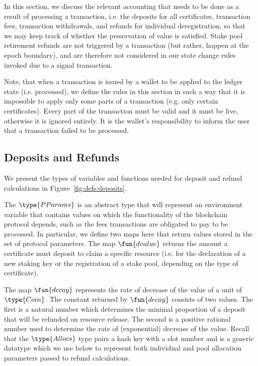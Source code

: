 \documentclass[11pt,a4paper,dvipsnames]{article}
\newcommand{\Coin}{\type{Coin}}
\newcommand{\PParams}{\type{PParams}}
\newcommand{\Allocs}{\type{Allocs}}
\theoremstyle{definition}
\theoremstyle{definition}
\begin{document}
In this section, we discuss the relevant accounting that needs to be done
as a result of processing a transaction, i.e. the deposits for all certificates,
transaction fees, transaction withdrawals, and refunds for individual
deregistration, so that we may keep track of whether the preservation of
value is satisfied. Stake pool retirement refunds are not triggered by a
transaction (but rather, happen at the epoch boundary), and are therefore
not considered in our state change rules invoked due to a signal transaction.

Note, that when a transaction is issued by a wallet to be applied to the ledger
state (i.e. processed),
we define the rules in this section in such a way that it is impossible to
apply only some parts of a transaction (e.g. only certain certificates).
Every part of the transaction must be valid and it must be live, otherwise
it is ignored entirely. It is the wallet's responsibility to inform the user
that a transaction failed to be processed.

\subsection{Deposits and Refunds}
\label{sec:deps-refunds}

We present the types of variables and functions needed for deposit and
refund calculations in Figure~\ref{fig:defs:deposits}.

The $\PParams$ is
an abstract type that will represent an environment variable that contains
values on which the functionality of the blockchain protocol depends, such
as the fees transactions are obligated to pay to be processed. In particular,
we define two maps here that return values stored in the set of protocol
parameters. The map $\fun{dvalue}$ returns the amount a certificate must
deposit to claim a specific resource (i.e. for the declaration of a new staking
key or the registration of a stake pool, depending on the type of certificate).

The map $\fun{decay}$
represents the rate of decrease of the value of a unit of $\Coin$.
The constant returned by $\fun{decay}$ consists of two values. The first is
a natural number which determines the minimal proportion of a deposit that will
be refunded on resource release. The second is a positive rational number
used to determine the rate of (exponential) decrease of the value.
Recall that the $\Allocs$ type pairs a hash key with a slot number and is a generic datatype
which we use below to represent both individual and pool allocation
parameters passed to refund calculations.
\end{document}
